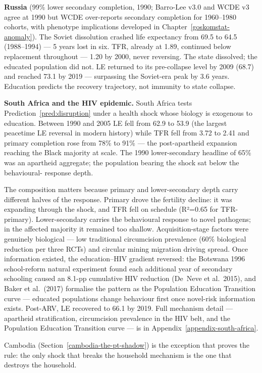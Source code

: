 \documentclass[12pt,letterpaper]{article}
\begin{document}
\textbf{Russia} (99\% lower secondary completion, 1990; Barro-Lee
v3.0 and WCDE v3 agree at 1990 but WCDE over-reports secondary
completion for 1960--1980 cohorts, with phenotype implications
developed in Chapter~\ref{goskomstat-anomaly}). The Soviet
dissolution crashed life expectancy from 69.5 to 64.5 (1988--1994) ---
5 years lost in six. TFR, already at 1.89, continued below replacement
throughout --- 1.20 by 2000, never reversing. The state dissolved; the
educated population did not. LE returned to its pre-collapse level by
2009 (68.7) and reached 73.1 by 2019 --- surpassing the Soviet-era peak
by 3.6 years. Education predicts the recovery trajectory, not immunity
to state collapse.

\textbf{South Africa and the HIV epidemic.} South Africa tests
Prediction~\ref{pred:disruption} under a health shock whose biology is
exogenous to education. Between 1990 and 2005 LE fell from 62.9 to
53.9 (the largest peacetime LE reversal in modern history) while TFR
fell from 3.72 to 2.41 and primary completion rose from 78\% to
91\% --- the post-apartheid expansion reaching the Black majority at
scale. The 1990 lower-secondary headline of 65\% was an apartheid
aggregate; the population bearing the shock sat below the behavioural-
response depth.

The composition matters because primary and lower-secondary depth
carry different halves of the response. Primary drove the fertility
decline: it was expanding through the shock, and TFR fell on schedule
(R²=0.65 for TFR-primary). Lower-secondary carries the behavioural
response to novel pathogens; in the affected majority it remained too
shallow. Acquisition-stage factors were genuinely biological ---
low traditional circumcision prevalence (60\% biological reduction per
three RCTs) and circular mining migration driving spread. Once
information existed, the education--HIV gradient reversed: the
Botswana 1996 school-reform natural experiment found each additional
year of secondary schooling caused an 8.1-pp cumulative HIV reduction
(De~Neve et al.~2015), and Baker et al.~(2017) formalise the pattern
as the Population Education Transition curve --- educated populations
change behaviour first once novel-risk information exists. Post-ARV,
LE recovered to 66.1 by 2019. Full mechanism detail --- apartheid
stratification, circumcision prevalence in the HIV belt, and the
Population Education Transition curve --- is in
Appendix~\ref{appendix-south-africa}.

Cambodia (Section~\ref{cambodia-the-pt-shadow}) is the exception that
proves the rule: the only shock that breaks the household mechanism is
the one that destroys the household.
\end{document}
